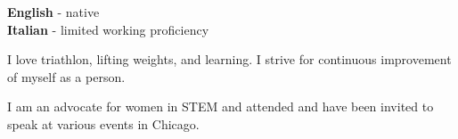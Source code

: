 \documentclass[9pt]{developercv} %
\begin{document}
\begin{minipage}[t]{0.3\textwidth}
	\vspace{-\baselineskip} %

	
	\textbf{English} - native\\
	\textbf{Italian} - limited working proficiency
\end{minipage}
\hfill
\begin{minipage}[t]{0.3\textwidth}
	\vspace{-\baselineskip} %
	
	
	I love triathlon, lifting weights, and learning. I strive for continuous improvement of myself as a person.
	\end{minipage}
\hfill
\begin{minipage}[t]{0.3\textwidth}
	\vspace{-\baselineskip} %
	
	
	I am an advocate for women in STEM and attended and have been invited to speak at various events in Chicago.
\end{minipage}

\end{document}
